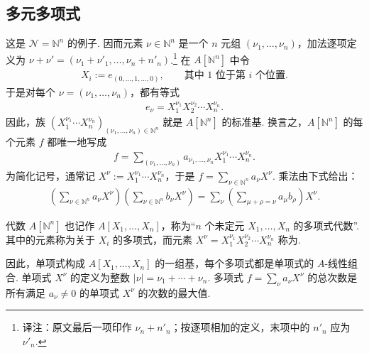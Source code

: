 \subsection{多元多项式}\label{sec:galois-1-4-5}
这是 $\mathcal N=\mathbb N^n$ 的例子. 因而元素 $\nu\in\mathbb N^n$ 是一个 $n$ 元组 $(\nu_1,\ldots,\nu_n)$，加法逐项定义为 $\nu+\nu'=(\nu_1+\nu'_1,\ldots,\nu_n+n'_n)$.\footnote{译注：原文最后一项印作 $\nu_n+n'_n$；按逐项相加的定义，末项中的 $n'_n$ 应为 $\nu'_n$.} 在 $A[\mathbb N^n]$ 中令
\begin{align*}
X_i:=e_{(0,\ldots,1,\ldots,0)},\qquad\text{其中 $1$ 位于第 $i$ 个位置.}
\end{align*}
于是对每个 $\nu=(\nu_1,\ldots,\nu_n)$，都有等式
\begin{align*}
e_\nu=X_1^{\nu_1}X_2^{\nu_2}\cdots X_n^{\nu_n}.
\end{align*}
因此，族 $(X_1^{\nu_1}\cdots X_n^{\nu_n})_{(\nu_1,\ldots,\nu_n)\in\mathbb N^n}$ 就是 $A[\mathbb N^n]$ 的标准基. 换言之，$A[\mathbb N^n]$ 的每个元素 $f$ 都唯一地写成
\begin{align*}
f=\sum_{(\nu_1,\ldots,\nu_n)}a_{\nu_1,\ldots,\nu_n}X_1^{\nu_1}\cdots X_n^{\nu_n}.
\end{align*}
为简化记号，通常记 $X^\nu:=X_1^{\nu_1}\cdots X_n^{\nu_n}$，于是 $f=\sum_{\nu\in\mathbb N^n}a_\nu X^\nu$. 乘法由下式给出：
\begin{align*}
\left(\sum_{\nu\in\mathbb N^n}a_\nu X^\nu\right)
\left(\sum_{\nu\in\mathbb N^n}b_\nu X^\nu\right)
=\sum_\nu\left(\sum_{\mu+\rho=\nu}a_\mu b_\rho\right)X^\nu.
\end{align*}
\begin{definition*}
代数 $A[\mathbb N^n]$ 也记作 $A[X_1,\ldots,X_n]$，称为``$n$ 个未定元 $X_1,\ldots,X_n$ 的多项式代数''. 其中的元素称为关于 $X_i$ 的多项式，而元素 $X^\nu=X_1^{\nu_1}X_2^{\nu_2}\cdots X_n^{\nu_n}$ 称为.
\end{definition*}
因此，单项式构成 $A[X_1,\ldots,X_n]$ 的一组基，每个多项式都是单项式的 $A$-线性组合. 单项式 $X^\nu$ 的定义为整数 $|\nu|=\nu_1+\cdots+\nu_n$. 多项式 $f=\sum_\nu a_\nu X^\nu$ 的总次数是所有满足 $a_\nu\ne0$ 的单项式 $X^\nu$ 的次数的最大值.

